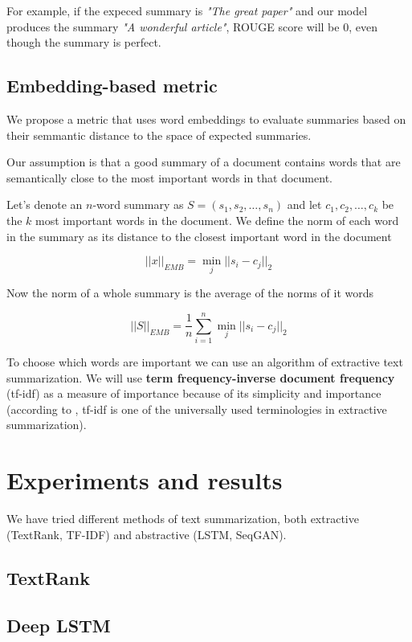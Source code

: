 \documentclass[sigplan]{acmart}
\begin{document}
For example, if the expeced summary is \textit{"The great paper"} and our model produces the summary \textit{"A wonderful article"}, ROUGE score will be $0$, even though the summary is perfect.

\subsection{Embedding-based metric}

We propose a metric that uses word embeddings to evaluate summaries based on their semmantic distance to the space of expected summaries.

Our assumption is that a good summary of a document contains words that are semantically close to the most important words in that document.

Let's denote an $n$-word summary as $S = (s_1, s_2, \dots, s_n)$ and let $c_1, c_2, \dots, c_k$ be the $k$ most important words in the document. We define the norm of each word in the summary as its distance to the closest important word in the document

\[ ||x||_{EMB} = \operatorname*{min}_j ||s_i - c_j||_2 \]

Now the norm of a whole summary is the average of the norms of it words

\[ ||S||_{EMB} = \frac1n \sum_{i=1}^n \operatorname*{min}_j ||s_i - c_j||_2 \]

To choose which words are important we can use an algorithm of extractive text summarization. We will use \textbf{term frequency-inverse document frequency} (tf-idf) as a measure of importance because of its simplicity and importance (according to \cite{kumar-16}, tf-idf is one of the universally used terminologies in extractive summarization).

\section{Experiments and results}

We have tried different methods of text summarization, both extractive (TextRank, TF-IDF) and abstractive (LSTM, SeqGAN).

\subsection{TextRank}


\subsection{Deep LSTM}
\end{document}
